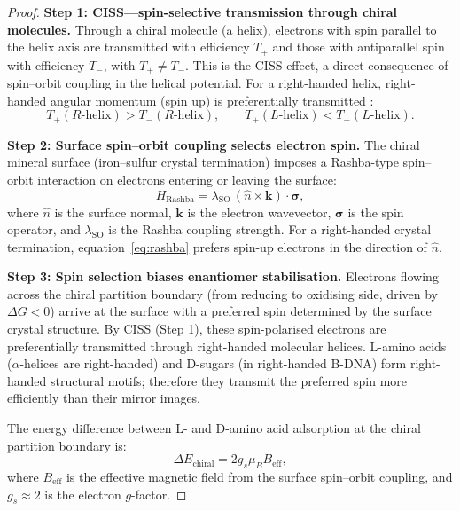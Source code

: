 \begin{proof}
\noindent\textbf{Step 1: CISS---spin-selective transmission through chiral molecules.}
Through a chiral molecule (a helix), electrons with spin parallel to the helix
axis are transmitted with efficiency $T_+$ and those with antiparallel spin with
efficiency $T_-$, with $T_+ \neq T_-$. This is the CISS effect, a direct
consequence of spin--orbit coupling in the helical potential. For a right-handed
helix, right-handed angular momentum (spin up) is preferentially transmitted
\citep{ray1999}:
\begin{equation}
  T_+(R\text{-helix}) > T_-(R\text{-helix}), \qquad
  T_+(L\text{-helix}) < T_-(L\text{-helix}).
  \label{eq:ciss}
\end{equation}

\noindent\textbf{Step 2: Surface spin--orbit coupling selects electron spin.}
The chiral mineral surface (iron--sulfur crystal termination) imposes a
Rashba-type spin--orbit interaction on electrons entering or leaving the surface:
\begin{equation}
  H_{\mathrm{Rashba}} = \lambda_{\mathrm{SO}}\,(\hat{n} \times \mathbf{k}) \cdot \boldsymbol{\sigma},
  \label{eq:rashba}
\end{equation}
where $\hat{n}$ is the surface normal, $\mathbf{k}$ is the electron wavevector,
$\boldsymbol{\sigma}$ is the spin operator, and $\lambda_{\mathrm{SO}}$ is the
Rashba coupling strength. For a right-handed crystal termination, equation~\eqref{eq:rashba}
prefers spin-up electrons in the direction of $\hat{n}$.

\noindent\textbf{Step 3: Spin selection biases enantiomer stabilisation.}
Electrons flowing across the chiral partition boundary (from reducing to
oxidising side, driven by $\Delta G < 0$) arrive at the surface with a preferred
spin determined by the surface crystal structure. By CISS (Step 1), these
spin-polarised electrons are preferentially transmitted through right-handed
molecular helices. L-amino acids ($\alpha$-helices are right-handed) and
D-sugars (in right-handed B-DNA) form right-handed structural motifs; therefore
they transmit the preferred spin more efficiently than their mirror images.

The energy difference between L- and D-amino acid adsorption at the chiral
partition boundary is:
\begin{equation}
  \Delta E_{\mathrm{chiral}} = 2g_s\mu_B B_{\mathrm{eff}},
  \label{eq:chiral_energy_gap}
\end{equation}
where $B_{\mathrm{eff}}$ is the effective magnetic field from the surface
spin--orbit coupling, and $g_s \approx 2$ is the electron $g$-factor.


\end{proof}
